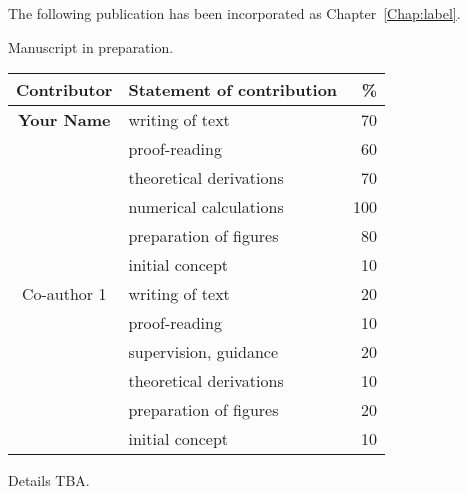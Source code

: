 \cleartoevenpage
\pagestyle{empty}	

\noindent
The following publication has been incorporated as Chapter~\ref{Chap:label}.

\noindent
Manuscript in preparation.

\begin{table}[h]
	\centering
	\begin{tabular}{clr}
		\toprule
		Contributor & Statement of contribution & \% \\
		\midrule
		\textbf{Your Name}				& writing of text 					& 70\\
															& proof-reading							& 60 \\
															& theoretical derivations 	& 70\\
															& numerical calculations 		& 100\\
															& preparation of figures 		& 80 \\
															& initial concept						& 10 \\
		\midrule
		Co-author 1								& writing of text 					& 20\\
															& proof-reading							& 10 \\
															& supervision, guidance 		& 20\\
															& theoretical derivations 	& 10\\
															& preparation of figures 		& 20 \\
															& initial concept						& 10 \\
		\bottomrule
	\end{tabular}
\end{table}

Details TBA.


